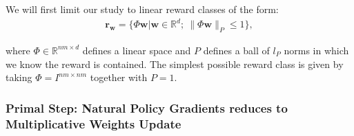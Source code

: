 
We will first limit our study to linear reward classes of the form:
\begin{align*}
    \bm{r}_{\bm{w}} = \Big\{ \Phi \bm{w} \Big| \bm{w}  \in \mathbb{R}^d ;~ \| \Phi \bm{w} \|_P \leq 1 \Big\},
\end{align*}

where $\Phi \in \mathbb{R}^{nm \times d}$ defines a linear space and $P$ defines a ball of $l_P$ norms in which we know the reward is contained. The simplest possible reward class is given by taking $\Phi = I^{nm\times nm}$ together with $P=1$.


\subsubsection{Primal Step: Natural Policy Gradients reduces to Multiplicative Weights Update} 

